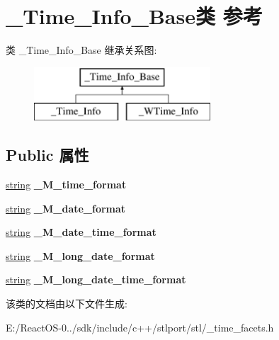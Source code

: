 \hypertarget{class___time___info___base}{}\section{\+\_\+\+Time\+\_\+\+Info\+\_\+\+Base类 参考}
\label{class___time___info___base}
类 \+\_\+\+Time\+\_\+\+Info\+\_\+\+Base 继承关系图\+:\begin{figure}[H]
\begin{center}
\leavevmode
\includegraphics[height=2.000000cm]{class___time___info___base}
\end{center}
\end{figure}
\subsection*{Public 属性}
\begin{DoxyCompactItemize}
\item 
\mbox{\label{class___time___info___base_ae02604a0d20f9a5e805a80ad34685095}} 
\hyperlink{structstring}{string} {\bfseries \+\_\+\+M\+\_\+time\+\_\+format}
\item 
\mbox{\label{class___time___info___base_a5c62d049f0bb18293d1aeb89adb32f4b}} 
\hyperlink{structstring}{string} {\bfseries \+\_\+\+M\+\_\+date\+\_\+format}
\item 
\mbox{\label{class___time___info___base_aaeee92bbdc37fb037cb3fc7b8e2c22e1}} 
\hyperlink{structstring}{string} {\bfseries \+\_\+\+M\+\_\+date\+\_\+time\+\_\+format}
\item 
\mbox{\label{class___time___info___base_afa775230b4f0b277db41435241933b78}} 
\hyperlink{structstring}{string} {\bfseries \+\_\+\+M\+\_\+long\+\_\+date\+\_\+format}
\item 
\mbox{\label{class___time___info___base_abd29e71ced0bb9b853ff9d26e30b86f8}} 
\hyperlink{structstring}{string} {\bfseries \+\_\+\+M\+\_\+long\+\_\+date\+\_\+time\+\_\+format}
\end{DoxyCompactItemize}


该类的文档由以下文件生成\+:\begin{DoxyCompactItemize}
\item 
E\+:/\+React\+O\+S-\/0../sdk/include/c++/stlport/stl/\+\_\+time\+\_\+facets.\+h\end{DoxyCompactItemize}
